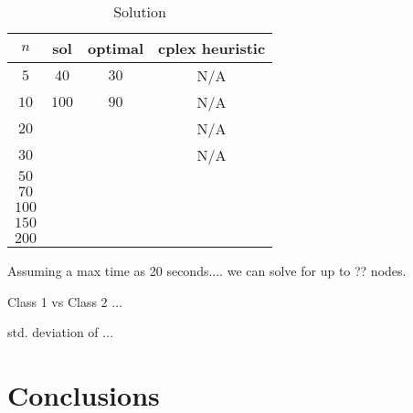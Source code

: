 \documentclass[a4paper, 11pt]{article}
\begin{document}
	\begin{table}[H]
		\centering
		\begin{tabular}{c|c|c|c}
			\textbf{$ n $} 	& \textbf{sol} & \textbf{optimal}   & \textbf{cplex heuristic}  \\ \hline
			$ 5  $			& $ 40 $ 		& $ 30 $ 			& N/A \\ \hline
			$ 10  $			& $ 100 $ 		& $ 90 $ 			& N/A \\ \hline
			$ 20  $			& $  $ 			& $  $ 				& N/A \\ \hline
			$ 30  $			& $  $	 		& $  $ 				& N/A \\ \hline
			$ 50  $			& $  $	 		& $  $ 				& $  $ \\ \hline
			$ 70  $			& $  $	 		& $  $ 				& $  $ \\ \hline
			$ 100 $			& $  $	 		& $  $ 				& $  $ \\ \hline
			$ 150 $			& $  $	 		& $  $ 				& $  $ \\ \hline
			$ 200 $			& $  $ 			& $  $ 				& $  $ \\
		\end{tabular}
		\caption{Solution}
		\label{table:sols}
	\end{table}
	
	Assuming a max time as 20 seconds.... we can solve for up to ?? nodes.
	
	Class 1 vs Class 2 $\ldots$
	
	std. deviation of $\ldots$
	
	
	\section{Conclusions}
	
	
\end{document}
